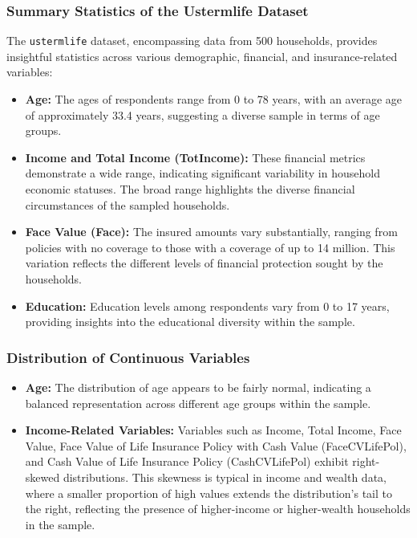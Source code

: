\documentclass[12pt, twoside,hidelinks]{article}
\theoremstyle{definition}
\numberwithin{equation}{section}
\begin{document}
\subsubsection{Summary Statistics of the Ustermlife Dataset}
The \texttt{ustermlife} dataset, encompassing data from 500 households, provides insightful statistics across various demographic, financial, and insurance-related variables:

\begin{itemize}
    \item \textbf{Age:} The ages of respondents range from 0 to 78 years, with an average age of approximately 33.4 years, suggesting a diverse sample in terms of age groups.
    
    \item \textbf{Income and Total Income (TotIncome):} These financial metrics demonstrate a wide range, indicating significant variability in household economic statuses. The broad range highlights the diverse financial circumstances of the sampled households.
    
    \item \textbf{Face Value (Face):} The insured amounts vary substantially, ranging from policies with no coverage to those with a coverage of up to 14 million. This variation reflects the different levels of financial protection sought by the households.
    
    \item \textbf{Education:} Education levels among respondents vary from 0 to 17 years, providing insights into the educational diversity within the sample.
\end{itemize}

\subsubsection*{Distribution of Continuous Variables}
\begin{itemize}
    \item \textbf{Age:} The distribution of age appears to be fairly normal, indicating a balanced representation across different age groups within the sample.
    
    \item \textbf{Income-Related Variables:} Variables such as Income, Total Income, Face Value, Face Value of Life Insurance Policy with Cash Value (FaceCVLifePol), and Cash Value of Life Insurance Policy (CashCVLifePol) exhibit right-skewed distributions. This skewness is typical in income and wealth data, where a smaller proportion of high values extends the distribution's tail to the right, reflecting the presence of higher-income or higher-wealth households in the sample.
\end{itemize}
\end{document}
